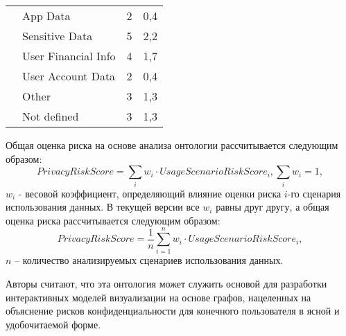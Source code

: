 \documentclass[../main]{subfiles}
\begin{document}
\begin{ltwrap}{2mm}{1.7}{\footnotesize}
\begin{longtable}[H]{|M{.15\x}|M{.3\x}|C{.15\x}|C{.15\x}|}

        & App Data
        & 2
        & 0,4\\
        

        & Sensitive Data
        & 5
        & 2,2\\
        

        & User Financial Info
        & 4
        & 1,7\\
        

        & User Account Data
        & 2
        & 0,4\\
        

        & Other
        & 3
        & 1,3\\
        

        & Not defined
        & 3
        & 1,3\\
        
        \hline
        
    \end{longtable}
\end{ltwrap}

Общая оценка риска на основе анализа онтологии рассчитывается следующим образом: 
\begin{equation}
    \label{eq:formula1}
    PrivacyRiskScore = \sum_i{w_i} \cdot UsageScenarioRiskScore_i, \sum_{i}{w_i} = 1,
\end{equation}
$w_i$ - весовой коэффициент, определяющий влияние оценки риска $i$-го сценария использования данных. В текущей версии все $w_i$ равны друг другу, а общая оценка риска рассчитывается следующим образом: 
\begin{equation}
    \label{eq:formula2}
    PrivacyRiskScore = \frac{1}{n}\sum^n_{i=1}{w_i} \cdot UsageScenarioRiskScore_i,
\end{equation}
$n$ -- количество анализируемых сценариев использования данных.

Авторы \cite{P2Onto} считают, что эта онтология может служить основой для разработки интерактивных моделей визуализации на основе графов, нацеленных на объяснение рисков конфиденциальности для конечного пользователя в ясной и удобочитаемой форме. 
\end{document}
